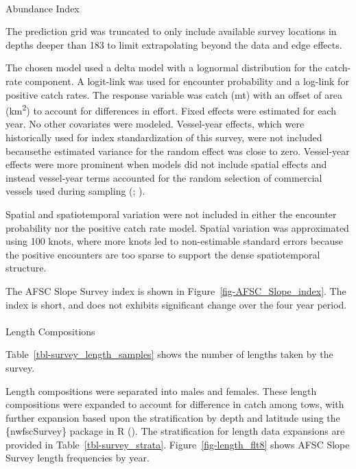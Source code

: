 \documentclass[
]{scrartcl}
\makeatletter
\let\oldparagraph\paragraph
\renewcommand{\paragraph}{
    \@ifstar
      \xxxParagraphStar
      \xxxParagraphNoStar
  }
\newcommand{\xxxParagraphStar}[1]{\oldparagraph*{#1}\mbox{}}
\newcommand{\xxxParagraphNoStar}[1]{\oldparagraph{#1}\mbox{}}
\makeatother
\begin{document}
\paragraph{Abundance Index}\label{abundance-index-2}

The prediction grid was truncated to only include available survey
locations in depths deeper than 183 to limit extrapolating beyond the
data and edge effects.

The chosen model used a delta model with a lognormal distribution for
the catch-rate component. A logit-link was used for encounter
probability and a log-link for positive catch rates. The response
variable was catch (mt) with an offset of area (km\textsuperscript{2})
to account for differences in effort. Fixed effects were estimated for
each year. No other covariates were modeled. Vessel-year effects, which
were historically used for index standardization of this survey, were
not included becausethe estimated variance for the random effect was
close to zero. Vessel-year effects were more prominent when models did
not include spatial effects and instead vessel-year terms accounted for
the random selection of commercial vessels used during sampling
(;
).

Spatial and spatiotemporal variation were not included in either the
encounter probability nor the positive catch rate model. Spatial
variation was approximated using 100 knots, where more knots led to
non-estimable standard errors because the positive encounters are too
sparse to support the dense spatiotemporal structure.

The AFSC Slope Survey index is shown in
Figure~\ref{fig-AFSC_Slope_index}. The index is short, and does not
exhibits significant change over the four year period.

\paragraph{Length Compositions}\label{length-compositions-1}

Table~\ref{tbl-survey_length_samples} shows the number of lengths taken
by the survey.

Length compositions were separated into males and females. These length
compositions were expanded to account for difference in catch among
tows, with further expansion based upon the stratification by depth and
latitude using the \{nwfscSurvey\} package in R
(). The stratification for length data expansions are provided in
Table~\ref{tbl-survey_strata}. Figure~\ref{fig-length_flt8} shows AFSC
Slope Survey length frequencies by year.
\end{document}
